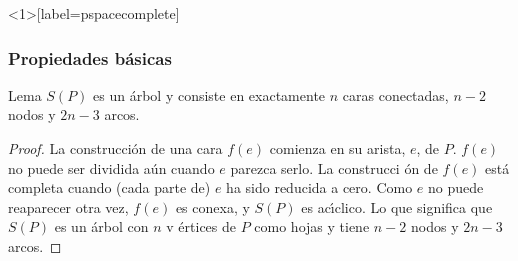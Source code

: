 \documentclass[notes=show]{beamer}
\begin{document}
\begin{frame}
<1>[label=pspacecomplete] 
\frametitle{Propiedades b\'asicas}

\begin{block}{Lema}
$S(P)$ es un \'{a}rbol y consiste en exactamente $n$ caras conectadas, $n-2$
nodos y $2n-3$ arcos.
\end{block}

\begin{overprint}
\hyperlink{pspacecomplete<2>}{}


\begin{proof}
 La construcci\'{o}n de una cara $f(e)$ comienza en su arista, $e$, de $P$. $%
f(e)$ no puede ser dividida a\'{u}n cuando $e$ parezca serlo. La construcci%
\'{o}n de $f(e)$ est\'{a} completa cuando (cada parte de) $e$ ha sido
reducida a cero. Como $e$ no puede reaparecer otra vez, $f(e)$ es conexa, y $%
S(P)$ es ac\'{\i}clico. Lo que significa que $S(P)$ es un \'{a}rbol con $n$ v%
\'{e}rtices de $P$ como hojas y tiene $n-2$ nodos y $2n-3$ arcos.
\end{proof}

\end{overprint}
\transdissolve[duration=0.4]
\end{frame}
\end{document}
